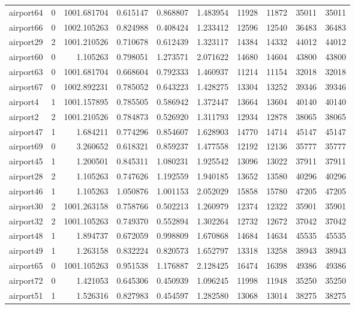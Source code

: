 \begin{longtable}{|l|r|r|r|r|r|r|r|r|r|}
airport64 & 0 & 1001.681704 & 0.615147 & 0.868807 & 1.483954 & 11928 & 11872 & 35011 & 35011 \\
airport66 & 0 & 1002.105263 & 0.824988 & 0.408424 & 1.233412 & 12596 & 12540 & 36483 & 36483 \\
airport29 & 2 & 1001.210526 & 0.710678 & 0.612439 & 1.323117 & 14384 & 14332 & 44012 & 44012 \\
airport60 & 0 & 1.105263 & 0.798051 & 1.273571 & 2.071622 & 14680 & 14604 & 43800 & 43800 \\
airport63 & 0 & 1001.681704 & 0.668604 & 0.792333 & 1.460937 & 11214 & 11154 & 32018 & 32018 \\
airport67 & 0 & 1002.892231 & 0.785052 & 0.643223 & 1.428275 & 13304 & 13252 & 39346 & 39346 \\
airport4 & 1 & 1001.157895 & 0.785505 & 0.586942 & 1.372447 & 13664 & 13604 & 40140 & 40140 \\
airport2 & 2 & 1001.210526 & 0.784873 & 0.526920 & 1.311793 & 12934 & 12878 & 38065 & 38065 \\
airport47 & 1 & 1.684211 & 0.774296 & 0.854607 & 1.628903 & 14770 & 14714 & 45147 & 45147 \\
airport69 & 0 & 3.260652 & 0.618321 & 0.859237 & 1.477558 & 12192 & 12136 & 35777 & 35777 \\
airport45 & 1 & 1.200501 & 0.845311 & 1.080231 & 1.925542 & 13096 & 13022 & 37911 & 37911 \\
airport28 & 2 & 1.105263 & 0.747626 & 1.192559 & 1.940185 & 13652 & 13580 & 40296 & 40296 \\
airport46 & 1 & 1.105263 & 1.050876 & 1.001153 & 2.052029 & 15858 & 15780 & 47205 & 47205 \\
airport30 & 2 & 1001.263158 & 0.758766 & 0.502213 & 1.260979 & 12374 & 12322 & 35901 & 35901 \\
airport32 & 2 & 1001.105263 & 0.749370 & 0.552894 & 1.302264 & 12732 & 12672 & 37042 & 37042 \\
airport48 & 1 & 1.894737 & 0.672059 & 0.998809 & 1.670868 & 14684 & 14634 & 45535 & 45535 \\
airport49 & 1 & 1.263158 & 0.832224 & 0.820573 & 1.652797 & 13318 & 13258 & 38943 & 38943 \\
airport65 & 0 & 1001.105263 & 0.951538 & 1.176887 & 2.128425 & 16474 & 16398 & 49386 & 49386 \\
airport72 & 0 & 1.421053 & 0.645306 & 0.450939 & 1.096245 & 11998 & 11948 & 35250 & 35250 \\
airport51 & 1 & 1.526316 & 0.827983 & 0.454597 & 1.282580 & 13068 & 13014 & 38275 & 38275 \\

\end{longtable}
